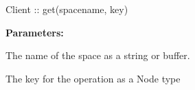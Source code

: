 %
%
%


\subsubsection{}
\label{api:nodejs:get}
\begin{javascriptcode}
Client :: get(spacename, key)
\end{javascriptcode}


\noindent\textbf{Parameters:}
\begin{description}[labelindent=\widthof{{\code{spacename}}},leftmargin=*,noitemsep,nolistsep,align=right]
\item[\code{spacename}] The name of the space as a string or buffer.
\item[\code{key}] The key for the operation as a Node type
\end{description}

